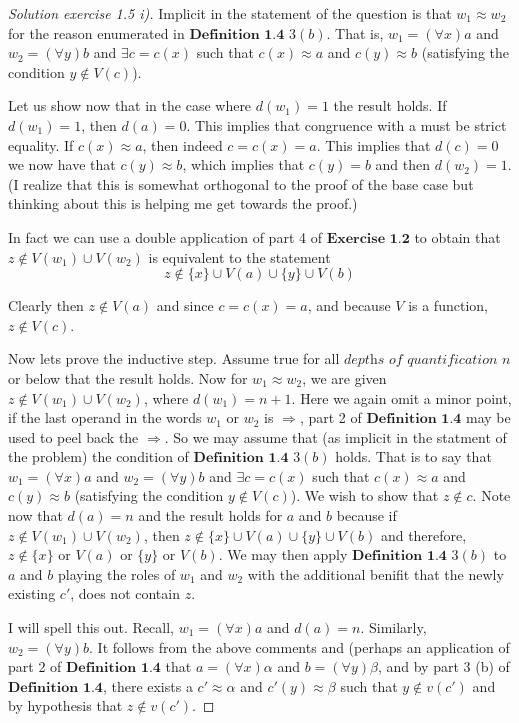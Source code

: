 \documentclass{article}
\theoremstyle{problemstyle}
\begin{document}
\begin{proof}[Solution exercise 1.5 i)]
Implicit in the statement of the question is that $w_1 \approx w_2$ for the reason enumerated in $\textbf{Definition 1.4}$ $3 (b)$. That is, $w_1 = (\forall x)a$ and $w_2 = (\forall y)b$ and $\exists c = c(x)$ such that $c(x) \approx a$ and $c(y) \approx b$ (satisfying the condition $y \notin V(c)$). 

Let us show now that in the case where $d(w_1) = 1$ the result holds. If $d(w_1) = 1$, then $d(a) = 0$. This implies that congruence with a must be strict equality. If $c(x) \approx a$, then indeed $c = c(x) = a$. This implies that $d(c) = 0$ we now have that $c(y) \approx b$, which implies that $c(y) = b$ and then $d(w_2) = 1$. (I realize that this is somewhat orthogonal to the proof of the base case but thinking about this is helping me get towards the proof.)

In fact we can use a double application of part 4 of $\textbf{Exercise 1.2}$ to obtain that $z \notin V(w_1) \cup V(w_2)$ is equivalent to the statement $$z \notin \{x\}\cup V(a) \cup \{y\}\cup V(b)$$ 

Clearly then $z \notin V(a)$ and since $c = c(x) = a$, and because $V$ is a function, $z \notin V(c)$.

Now lets prove the inductive step. Assume true for all $\textit{depths of quantification}$ $n$ or below that the result holds. Now for $w_1 \approx w_2$, we are given $z \notin V(w_1) \cup V(w_2)$, where $d(w_1) = n+1$. Here we again omit a minor point, if the last operand in the words $w_1$ or $w_2$ is $\Rightarrow$, part 2 of $\textbf{Definition 1.4}$ may be used to peel back the $\Rightarrow$. So we may assume that (as implicit in the statment of the problem) the condition of $\textbf{Definition 1.4}$ $3 (b)$ holds. That is to say that $w_1 = (\forall x)a$ and $w_2 = (\forall y)b$ and $\exists c = c(x)$ such that $c(x) \approx a$ and $c(y) \approx b$ (satisfying the condition $y \notin V(c)$). We wish to show that $z \notin c$. Note now that $d(a) = n$ and the result holds for $a$ and $b$ because if $z \notin V(w_1) \cup V(w_2)$, then $z \notin \{x\}\cup V(a) \cup \{y\}\cup V(b)$ and therefore, $z \notin \{x\}$ or $V(a)$ or $\{y\}$ or $V(b)$. We may then apply $\textbf{Definition 1.4}$ $3 (b)$ to $a$ and $b$ playing the roles of $w_1$ and $w_2$ with the additional benifit that the newly existing $c'$, does not contain $z$. 

I will spell this out. Recall, $w_1 = (\forall x)a$ and $d(a) = n$. Similarly, $w_2 = (\forall y)b$. It follows from the above comments and (perhaps an application of part 2 of $\textbf{Definition 1.4}$ that $a = (\forall x)\alpha$ and $b = (\forall y)\beta$, and by part 3 (b) of $\textbf{Definition 1.4}$, there exists a $c' \approx \alpha$ and $c'(y)\approx \beta$ such that $y \notin v(c')$ and by hypothesis that $z \notin v(c')$. 


\end{proof}
\end{document}
